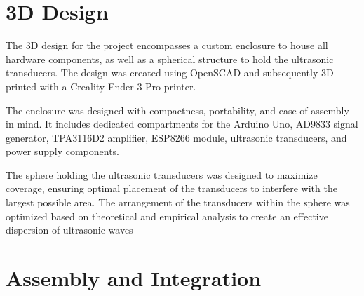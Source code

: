 \section{3D Design}

The 3D design for the project encompasses a custom enclosure to house all hardware components, as well as a spherical structure to hold the ultrasonic transducers. The design was created using OpenSCAD and subsequently 3D printed with a Creality Ender 3 Pro printer.

The enclosure was designed with compactness, portability, and ease of assembly in mind. It includes dedicated compartments for the Arduino Uno, AD9833 signal generator, TPA3116D2 amplifier, ESP8266 module, ultrasonic transducers, and power supply components.

The sphere holding the ultrasonic transducers was designed to maximize coverage, ensuring optimal placement of the transducers to interfere with the largest possible area. The arrangement of the transducers within the sphere was optimized based on theoretical and empirical analysis to create an effective dispersion of ultrasonic waves

\section{Assembly and Integration}

